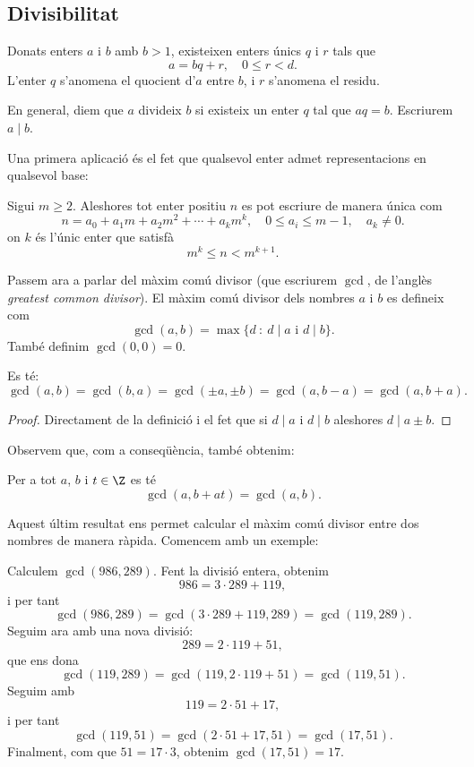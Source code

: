 \subsection{Divisibilitat}
\begin{theorem}
Donats enters $a$ i $b$ amb $b > 1$, existeixen enters únics $q$ i $r$ tals que
\[
a = bq +r,\quad 0\leq r < d.
\]
L'enter $q$ s'anomena el quocient d'$a$ entre $b$, i $r$ s'anomena el residu.
\end{theorem}
En general, diem que $a$ divideix $b$ si existeix un enter $q$ tal que $aq=b$. Escriurem $a\mid b$.

Una primera aplicació és el fet que qualsevol enter admet representacions en qualsevol base:
\begin{theorem}
Sigui $m\geq 2$. Aleshores tot enter positiu $n$ es pot escriure de manera única com
\[
n = a_0 + a_1 m+a_2m^2+\cdots+ a_km^k, \quad 0\leq a_i\leq m-1,\quad a_k\neq 0.
\]
on $k$ és l'únic enter que satisfà
\[
m^k \leq n < m^{k+1}.
\]
\end{theorem}

Passem ara a parlar del màxim comú divisor (que escriurem $\gcd$, de l'anglès \emph{greatest common divisor}). El màxim comú divisor dels nombres $a$ i $b$ es defineix com
\[
\gcd(a,b)=\max\{d ~\colon~ d\mid a\text{ i } d\mid b\}.
\]
També definim $\gcd(0,0)=0$.

\begin{lemma}
Es té:
\[
\gcd(a,b) = \gcd(b,a)=\gcd(\pm a,\pm b) = \gcd(a,b-a) = \gcd(a,b+a). 
\]
\end{lemma}
\begin{proof}
   Directament de la definició i el fet que si $d\mid a$ i $d\mid b$ aleshores $d\mid a\pm b$.
\end{proof}

Observem que, com a conseqüència, també obtenim:
\begin{corollary}
Per a tot $a$, $b$ i $t \in \Z$ es té
\[
\gcd(a,b+at) = \gcd(a,b).
\]
\end{corollary}

Aquest últim resultat ens permet calcular el màxim comú divisor entre dos nombres de manera ràpida. Comencem amb un exemple:

\begin{example}
Calculem $\gcd(986,289)$. Fent la divisió entera, obtenim
\[
986 = 3\cdot 289 + 119,
\]
i per tant
\[
\gcd(986,289) = \gcd(3\cdot 289+119,289) = \gcd(119,289).
\]
Seguim ara amb una nova divisió:
\[
289 = 2\cdot 119 + 51,
\]
que ens dona
\[
\gcd(119,289) = \gcd(119,2\cdot 119 + 51) = \gcd(119, 51).
\]
Seguim amb
\[
119 = 2\cdot 51 + 17,
\]
i per tant
\[
\gcd(119,51) = \gcd(2\cdot 51+ 17,51) = \gcd(17,51).
\]
Finalment, com que $51=17\cdot 3$, obtenim $\gcd(17,51) = 17$.
\end{example}

